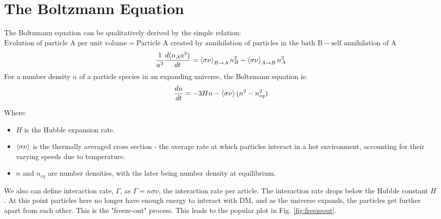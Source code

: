 \documentclass[12pt]{article}
\begin{document}
\section{The Boltzmann Equation}
\label{sec:boltzmann}
The Boltzmann equation can be qualitatively derived by the simple relation:
$\text{Evolution of particle A per unit volume} = \text{Particle A created by annihilation of particles in the bath B} - \text{self annihilation of A}$
\begin{equation}
    \begin{split}
        \frac{1}{a^3}\frac{d(n_Aa^3)}{dt} = \braket{\sigma \nu}_{B \rightarrow A} n^2_B- \braket{\sigma \nu}_{A \rightarrow B}n^2_A
          
    \end{split}
\end{equation}
For a number density $n$ of a particle species in an expanding universe, the Boltzmann equation is:
\begin{equation}
    \label{eqn:boltzmann}
    \frac{dn}{dt} = -3Hn - \braket{\sigma\nu}(n^2 - n^2_{eq})
\end{equation}

Where:
\begin{itemize}
    \item $H$ is the Hubble expansion rate.
    \item $\braket{\sigma\nu}$ is the thermally averaged cross section - the average rate at which particles interact in a hot environment, accounting for their varying speeds due to temperature.
    \item $n$ and $n_{eq}$ are number densities, with the later being number density at equilibrium.
\end{itemize}

We also can define interaction rate, $\Gamma$, as $\Gamma = n\sigma\nu$, the interaction rate per article. The interaction rate drops below the Hubble constant $H$. At this point particles here no longer have enough energy to interact with DM, and as the universe expands, the particles get further apart from each other. This is the "freeze-out" process. This leads to the popular plot in Fig. \ref{fig:freezeout}.
\end{document}
